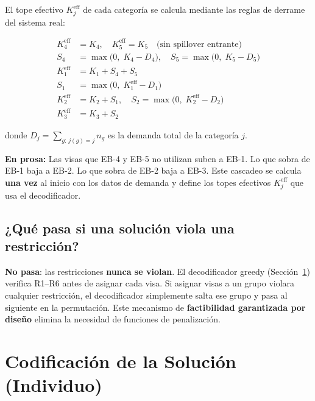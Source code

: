 \documentclass[12pt,letterpaper]{article}
\begin{document}
El tope efectivo $K_j^{\text{eff}}$ de cada categoría se calcula mediante las reglas de derrame del sistema real:

\begin{formulabox}
\begin{align}
K_4^{\text{eff}} &= K_4, \quad K_5^{\text{eff}} = K_5 \quad \text{(sin spillover entrante)} \label{eq:keff45}\\[4pt]
S_4 &= \max\bigl(0,\; K_4 - D_4\bigr), \quad S_5 = \max\bigl(0,\; K_5 - D_5\bigr) \label{eq:spill45}\\[4pt]
K_1^{\text{eff}} &= K_1 + S_4 + S_5 \label{eq:keff1}\\[4pt]
S_1 &= \max\bigl(0,\; K_1^{\text{eff}} - D_1\bigr) \label{eq:spill1}\\[4pt]
K_2^{\text{eff}} &= K_2 + S_1, \quad S_2 = \max\bigl(0,\; K_2^{\text{eff}} - D_2\bigr) \label{eq:keff2}\\[4pt]
K_3^{\text{eff}} &= K_3 + S_2 \label{eq:keff3}
\end{align}

donde $D_j = \sum_{g:\, j(g)=j} n_g$ es la demanda total de la categoría $j$.
\end{formulabox}

\textbf{En prosa:} Las visas que EB-4 y EB-5 no utilizan suben a EB-1. Lo que sobra de EB-1 baja a EB-2. Lo que sobra de EB-2 baja a EB-3. Este cascadeo se calcula \textbf{una vez} al inicio con los datos de demanda y define los topes efectivos $K_j^{\text{eff}}$ que usa el decodificador.

\subsection{¿Qué pasa si una solución viola una restricción?}

\begin{resultbox}
\textbf{No pasa}: las restricciones \textbf{nunca se violan}. El decodificador greedy (Sección~\ref{sec:codificacion}) verifica R1--R6 antes de asignar cada visa. Si asignar visas a un grupo violara cualquier restricción, el decodificador simplemente salta ese grupo y pasa al siguiente en la permutación. Este mecanismo de \textbf{factibilidad garantizada por diseño} elimina la necesidad de funciones de penalización.
\end{resultbox}


\newpage
\section{Codificación de la Solución (Individuo)}
\label{sec:codificacion}
\end{document}
